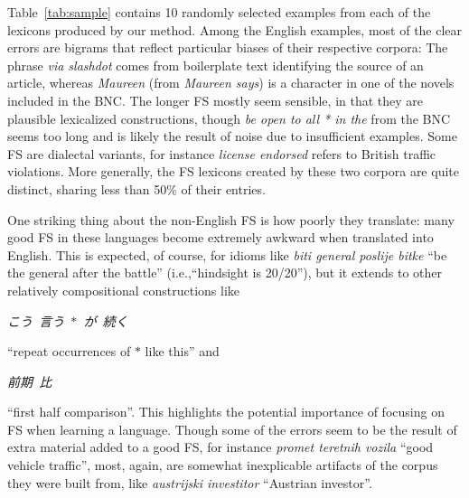 \documentclass[11pt,letterpaper]{article}
\makeatletter
\def \ie {i.e.,\@ }
\newcommand{\gap}{$*$\xspace}
\newcommand{\ex}[1]{\textit{#1}\xspace}
\newcommand{\gl}[1]{``#1''\xspace}
\newcommand{\tabref}[2][]{Table#1~\ref{#2}\xspace}
\makeatother
\begin{document}
\tabref{tab:sample} contains 10 randomly selected examples from each of the lexicons produced by our method. Among the English examples, most of the clear errors are bigrams that reflect particular biases of their respective corpora: The phrase \ex{via slashdot} comes from boilerplate text identifying the source of an article, whereas \ex{Maureen} (from \ex{Maureen says}) is a character in one of the novels included in the BNC. The longer FS mostly seem sensible, in that they are plausible lexicalized constructions, though \ex{be open to all * in the} from the BNC seems too long and is likely the result of noise due to insufficient examples. Some FS are dialectal variants, for instance \ex{license endorsed} refers to British traffic violations. More generally, the FS lexicons created by these two corpora are quite distinct, sharing less than 50\% of their entries.

One striking thing about the non-English FS is how poorly they translate: many good FS in these languages become extremely awkward when translated into English. This is expected, of course, for idioms like \ex{biti general poslije bitke} \gl{be the general after the battle} (\ie \gl{hindsight is 20/20}), but it extends to other relatively compositional  constructions like 
\begin{CJK*}{UTF8}{min} \ex{こう\ 言う\ \gap\ が\ 続く} \end{CJK*} \gl{repeat occurrences of \gap like this} and 
\begin{CJK*}{UTF8}{min} \ex{前期\ 比} \end{CJK*} 
\gl{first half comparison}. This highlights the potential importance of focusing on FS when learning a language. Though some of the errors seem to be the result of extra material added to a good FS, for instance \ex{promet teretnih vozila} \gl{good vehicle traffic}, most, again, are somewhat inexplicable artifacts of the corpus they were built from, like \ex{austrijski investitor} \gl{Austrian investor}.
\end{document}
